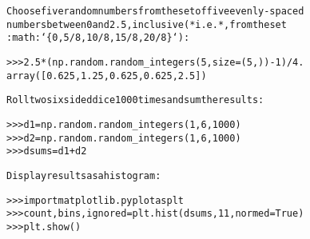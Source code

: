 \begin{boxedminipage}{\funcwidth}
\begin{alltt}
Choose five random numbers from the set of five evenly-spaced
numbers between 0 and 2.5, inclusive (*i.e.*, from the set
:math:`\{0, 5/8, 10/8, 15/8, 20/8\}`):

{\textgreater}{\textgreater}{\textgreater} 2.5 * (np.random.random\_integers(5, size=(5,)) - 1) / 4.
array([ 0.625,  1.25 ,  0.625,  0.625,  2.5  ])

Roll two six sided dice 1000 times and sum the results:

{\textgreater}{\textgreater}{\textgreater} d1 = np.random.random\_integers(1, 6, 1000)
{\textgreater}{\textgreater}{\textgreater} d2 = np.random.random\_integers(1, 6, 1000)
{\textgreater}{\textgreater}{\textgreater} dsums = d1 + d2

Display results as a histogram:

{\textgreater}{\textgreater}{\textgreater} import matplotlib.pyplot as plt
{\textgreater}{\textgreater}{\textgreater} count, bins, ignored = plt.hist(dsums, 11, normed=True)
{\textgreater}{\textgreater}{\textgreater} plt.show()
\end{alltt}

\setlength{\parskip}{1ex}
    \end{boxedminipage}

    \label{trunk:qstkutil:bollinger:random_sample}

    \vspace{0.5ex}

